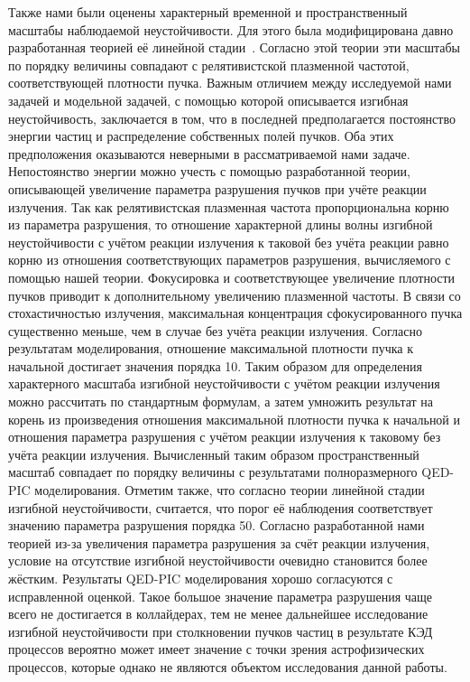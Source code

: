 Также нами были оценены характерный временной и пространственный масштабы наблюдаемой неустойчивости.
Для этого была модифицирована давно разработанная теорией её линейной стадии~\cite{chin1987stability, yokoya1992beam}.
Согласно этой теории эти масштабы по порядку величины совпадают с релятивистской плазменной частотой, соответствующей плотности пучка.
Важным отличием между исследуемой нами задачей и модельной задачей, с помощью которой описывается изгибная неустойчивость, заключается в том, что в последней предполагается постоянство энергии частиц и распределение собственных полей пучков.
Оба этих предположения оказываются неверными в рассматриваемой нами задаче.
Непостоянство энергии можно учесть с помощью разработанной теории, описывающей увеличение параметра разрушения пучков при учёте реакции излучения.
Так как релятивистская плазменная частота пропорциональна корню из параметра разрушения, то отношение характерной длины волны изгибной неустойчивости с учётом реакции излучения к таковой без учёта реакции равно корню из отношения соответствующих параметров разрушения, вычисляемого с помощью нашей теории.
Фокусировка и соответствующее увеличение плотности пучков приводит к дополнительному увеличению плазменной частоты.
В связи со стохастичностью излучения, максимальная концентрация сфокусированного пучка существенно меньше, чем в случае без учёта реакции излучения. Согласно результатам моделирования, отношение максимальной плотности пучка к начальной достигает значения порядка 10.
Таким образом для определения характерного масштаба изгибной неустойчивости с учётом реакции излучения можно рассчитать по стандартным формулам, а затем умножить результат на корень из произведения отношения максимальной плотности пучка к начальной и отношения параметра разрушения с учётом реакции излучения к таковому без учёта реакции излучения.
Вычисленный таким образом пространственный масштаб совпадает по порядку величины с результатами полноразмерного QED-PIC моделирования.
Отметим также, что согласно теории линейной стадии изгибной неустойчивости, считается, что порог её наблюдения соответствует значению параметра разрушения порядка 50.
Согласно разработанной нами теорией из-за увеличения параметра разрушения за счёт реакции излучения, условие на отсутствие изгибной неустойчивости очевидно становится более жёстким.
Результаты QED-PIC моделирования хорошо согласуются с исправленной оценкой.
Такое большое значение параметра разрушения чаще всего не достигается в коллайдерах, тем не менее дальнейшее исследование изгибной неустойчивости при столкновении пучков частиц в результате КЭД процессов вероятно может имеет значение с точки зрения астрофизических процессов, которые однако не являются объектом исследования данной работы.

